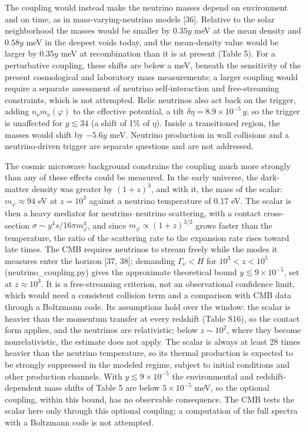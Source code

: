 \documentclass[preprint,12pt]{elsarticle}
\begin{document}
The coupling would instead make the neutrino masses depend on environment and on time, as in mass-varying-neutrino models [36]. Relative to the solar neighborhood the masses would be smaller by $0.35y$ meV at the mean density and $0.58y$ meV in the deepest voids today, and the mean-density value would be larger by $0.35y$ meV at recombination than it is at present (Table 5). For a perturbative coupling, these shifts are below a meV, beneath the sensitivity of the present cosmological and laboratory mass measurements; a larger coupling would require a separate assessment of neutrino self-interaction and free-streaming constraints, which is not attempted. Relic neutrinos also act back on the trigger, adding $n_\nu m_\nu(\varphi)$ to the effective potential, a tilt $\delta\eta=8.9\times10^{-5}\,y$, so the trigger is unaffected for $y\lesssim34$ (a shift of 1\% of $\eta$). Inside a transitioned region, the masses would shift by $-5.6y$ meV. Neutrino production in wall collisions and a neutrino-driven trigger are separate questions and are not addressed.

The cosmic microwave background constrains the coupling much more strongly than any of these effects could be measured. In the early universe, the dark-matter density was greater by $(1+z)^3$, and with it, the mass of the scalar: $m_\varphi\approx94$ eV at $z=10^3$ against a neutrino temperature of 0.17 eV. The scalar is then a heavy mediator for neutrino--neutrino scattering, with a contact cross-section $\sigma\sim y^4s/16\pi m_\varphi^4$, and since $m_\varphi\propto(1+z)^{3/2}$ grows faster than the temperature, the ratio of the scattering rate to the expansion rate rises toward late times. The CMB requires neutrinos to stream freely while the modes it measures enter the horizon [37, 38]; demanding $\Gamma_\nu<H$ for $10^3<z<10^5$ (neutrino\_coupling.py) gives the approximate theoretical bound $y\lesssim9\times10^{-5}$, set at $z\approx10^3$. It is a free-streaming criterion, not an observational confidence limit, which would need a consistent collision term and a comparison with CMB data through a Boltzmann code. Its assumptions hold over the window: the scalar is heavier than the momentum transfer at every redshift (Table S16), so the contact form applies, and the neutrinos are relativistic; below $z\sim10^2$, where they become nonrelativistic, the estimate does not apply. The scalar is always at least 28 times heavier than the neutrino temperature, so its thermal production is expected to be strongly suppressed in the modeled regime, subject to initial conditions and other production channels. With $y\lesssim9\times10^{-5}$ the environmental and redshift-dependent mass shifts of Table 5 are below $5\times10^{-5}$ meV, so the optional coupling, within this bound, has no observable consequence. The CMB tests the scalar here only through this optional coupling; a computation of the full spectra with a Boltzmann code is not attempted.
\end{document}
